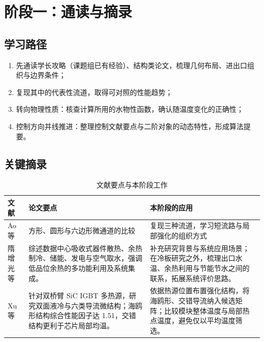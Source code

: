 \documentclass[stage1,fontset=fandol]{ydzjreport}
\begin{document}
	\section{阶段一：通读与摘录}
	
	\subsection{学习路径}
	
	\begin{enumerate}
		\item 先通读学长攻略（课题组已有经验）、结构类论文，梳理几何布局、进出口组织与边界条件；
		\item 复现其中的代表性流道，取得可对照的性能趋势；
		\item 转向物理性质：核查计算所用的水物性函数，确认随温度变化的正确性；
		\item 控制方向并线推进：整理控制文献要点与二阶对象的动态特性，形成算法提要。
	\end{enumerate}
	
	\subsection{关键摘录}
	
	

	\begin{table}[H]
	  \centering
	  \small
	  \renewcommand{\arraystretch}{1.12}
	  \caption{文献要点与本阶段工作}
	  \label{tab:notes}
	  \begin{tabularx}{\textwidth}{@{}>{\RaggedRight\arraybackslash}p{} Y Y@{}}
	    \toprule
	     文献 & 论文要点 & 本阶段的应用 \\
	    \midrule
	    Ao 等\cite{ao} & 方形、圆形与六边形微通道的比较 & 复现三种流道，学习短流路与局部强化的组织方式 \\[3pt]
	    隋增光等\cite{ref1} & 综述数据中心吸收式器件散热、余热制冷、储能、发电与空气取水，强调低品位余热的多功能利用及系统集成。 & 补充研究背景与系统应用场景；在冷板研究之外，梳理出口水温、余热利用与节能节水之间的联系，拓展系统评价思路。 \\[3pt]
	    Xu 等\cite{ref2} & 针对双桥臂 SiC IGBT 多热源，研究双面液冷与六类导流微结构；海鸥形结构综合性能因子达 1.51，交错结构更利于芯片局部均温。 & 依据热源位置布置强化结构，将海鸥形、交错导流纳入候选矩阵；比较模块整体温度与局部热点温度，避免仅以平均温度筛选。 \\[3pt]

	    \bottomrule
	  \end{tabularx}
	\end{table}
\end{document}
